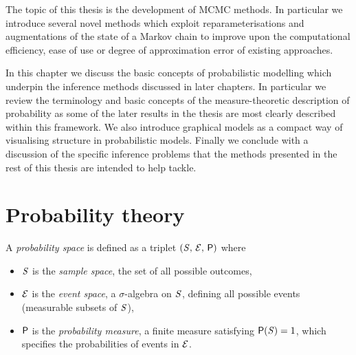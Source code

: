The topic of this thesis is the development of \ac{MCMC} methods. In particular we introduce several novel methods which exploit reparameterisations and augmentations of the state of a Markov chain to improve upon the computational efficiency, ease of use or degree of approximation error of existing approaches.


In this chapter we discuss the basic concepts of probabilistic modelling which underpin the inference methods discussed in later chapters. In particular we review the terminology and basic concepts of the measure-theoretic description of probability as some of the later results in the thesis are most clearly described within this framework. We also introduce graphical models as a compact way of visualising structure in probabilistic models. Finally we conclude with a discussion of the specific inference problems that the methods presented in the rest of this thesis are intended to help tackle.




\newpage 
\section{Probability theory}\label{sec:probability-theory}

A \emph{probability space} is defined as a triplet $(\mathit{S},\,\mathcal{E},\,\mathsf{P})$ where

\begin{itemize}
  \item $\mathit{S}$ is the \emph{sample space}, the set of all possible outcomes,
  \item $\mathcal{E}$ is the \emph{event space}, a $\sigma$-algebra on $\mathit{S}$, defining all possible events (measurable subsets of $\mathit{S}$),
  \item $\mathsf{P}$ is the \emph{probability measure}, a finite measure satisfying $\mathsf{P}(\mathit{S}) = 1$, which specifies the probabilities of events in $\mathcal{E}$.
\end{itemize}

